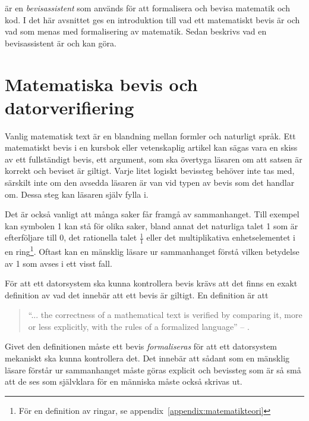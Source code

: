 \coq{} är en \emph{bevisassistent} som används för att formalisera och bevisa
matematik och kod.
I det här avsnittet ges en introduktion till vad ett matematiskt bevis är och vad som menas med
formalisering av matematik. Sedan beskrivs vad en bevisassistent är och kan
göra.

\section{Matematiska bevis och datorverifiering}
Vanlig matematisk text är en blandning mellan formler och naturligt språk. Ett
matematiskt bevis i en kursbok eller vetenskaplig artikel kan sägas vara en
skiss av ett fullständigt bevis, ett argument, som ska övertyga läsaren om att
satsen är korrekt och beviset är giltigt. Varje litet logiskt bevissteg behöver
inte tas med, särskilt inte om den avsedda läsaren är van vid typen av bevis
som det handlar om. Dessa steg kan läsaren själv fylla i.


Det är också vanligt att många saker får framgå av sammanhanget.
Till
exempel kan symbolen 1 kan stå för olika saker, bland annat det naturliga talet
1 som är efterföljare till 0, det rationella talet $\frac{1}{1}$ eller det
multiplikativa enhetselementet i en ring\footnote{För en definition av ringar,
se appendix~\ref{appendix:matematikteori}}. Oftast kan en mänsklig läsare ur
sammanhanget förstå vilken betydelse av 1 som avses i ett visst fall.

För att ett datorsystem ska kunna kontrollera bevis krävs att det finns en
exakt definition av vad det innebär att ett bevis är giltigt. En definition är
att
\begin{quote}
``... the correctness of a mathematical text is verified by comparing it, more or
less explicitly, with the rules of a formalized language'' -- \cite{bourbaki1968sets}.
\end{quote}

Givet den definitionen måste ett bevis \emph{formaliseras} för att ett
datorsystem mekaniskt ska kunna kontrollera det. Det innebär att sådant som en
mänsklig läsare förstår ur sammanhanget måste göras explicit och bevissteg som
är så små att de ses som självklara för en människa måste också skrivas ut.

